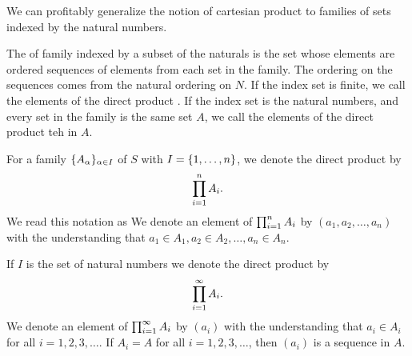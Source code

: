 
\sbasic




\sstart



We can profitably generalize the notion of cartesian product to families of sets indexed by the natural numbers.


The  of family indexed by a subset of the naturals is the set whose elements are ordered sequences of elements from each set in the family.
The ordering on the sequences comes from the natural ordering on $N$.
If the index set is finite, we call the elements of the direct product .
If the index set is the natural numbers, and every set in the family is the same set $A$, we call the elements of the direct product teh  in $A$.


For a family $\{A_{\alpha}\}_{\alpha \in I}$ of $S$ with $I = \{1, \dots, n\}$, we denote the direct product by
\[
  \prod_{i = 1}^{n} A_{i}.
\]
We read this notation as 
We denote an element of $\prod_{i = 1}^{n} A_{i}$ by $(a_1, a_2, \dots, a_n)$ with the understanding that $a_1 \in A_1, a_2 \in A_2, \dots, a_n \in A_n$.

If $I$ is the set of natural numbers we denote the direct product by
\[
  \prod_{i = 1}^{\infty} A_{i}.
\]
We denote an element of $\prod_{i = 1}^{\infty} A_{i}$ by $(a_i)$ with the understanding that $a_i \in A_i$ for all $i = 1,2,3,\dots$.
If $A_i = A$ for all $i = 1, 2, 3,\dots$, then $(a_i)$ is a sequence in $A$.

\strats
